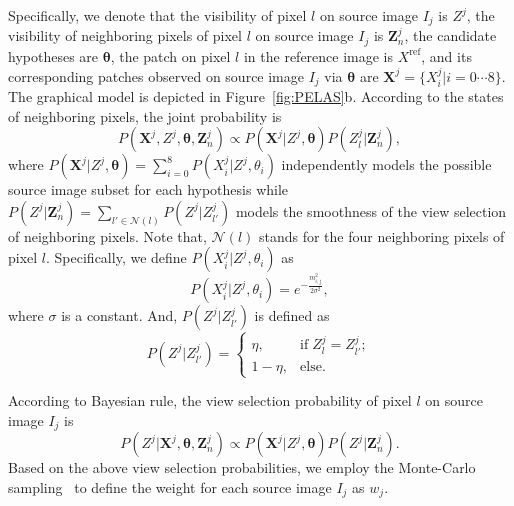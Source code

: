 \documentclass[letterpaper]{article} %
\begin{document}
Specifically, we denote that the visibility of pixel $l$ on source image $I_{j}$ is $Z^{j}$, the visibility of neighboring pixels of pixel $l$ on source image $I_{j}$ is $\boldsymbol{Z}_{n}^{j}$, the candidate hypotheses are $\boldsymbol{\theta}$, the patch on pixel $l$ in the reference image is $X^\text{ref}$, and its corresponding patches observed on source image $I_{j}$ via $\boldsymbol{\theta}$ are $\boldsymbol{X}^{j}=\{X_{i}^{j}|i=0\cdots8\}$. The graphical model is depicted in Figure~\ref{fig:PELAS}b. According to the states of neighboring pixels, %
the joint probability is 
\begin{equation}
P(\boldsymbol{X}^{j},Z^{j},\boldsymbol{\theta},\boldsymbol{Z}_{n}^{j}){\propto}P(\boldsymbol{X}^{j}|Z^{j},\boldsymbol{\theta})P(Z_{l}^{j}|\boldsymbol{Z}_{n}^{j}),
\end{equation}
where $P(\boldsymbol{X}^{j}|Z^{j},\boldsymbol{\theta})=\sum_{i=0}^{8}P(X_{i}^{j}|Z^{j},\theta_{i})$ independently models the possible source image subset for each hypothesis while $P(Z^{j}|\boldsymbol{Z}_{n}^{j})=\sum_{l'\in \mathcal{N}(l)} P(Z^{j}|Z_{l'}^{j})$ models the smoothness of the view selection of neighboring pixels. Note that, $\mathcal{N}(l)$ stands for the four neighboring pixels of pixel $l$. Specifically, we define $P(X_{i}^{j}|Z^{j},\theta_{i})$ as
\begin{equation}
P(X_{i}^{j}|Z^{j},\theta_{i})=e^{-\frac{m_{i,j}^2}{2\sigma^2}},
\end{equation}
where $\sigma$ is a constant. And, $P(Z^{j}|Z_{l'}^{j})$ is defined as
\begin{equation}
P(Z^{j}|Z_{l'}^{j})=\left\{ \begin{array}{ll}
\eta, & \textrm{if}\;Z_{l}^{j}=Z_{l'}^{j}; \\
1-\eta, & {\textrm{else.}}
\end{array} \right.
\end{equation}

According to Bayesian rule, the view selection probability of pixel $l$ on source image $I_{j}$ is 
\begin{equation}
P(Z^{j}|\boldsymbol{X}^{j},\boldsymbol{\theta},\boldsymbol{Z}_{n}^{j}){\propto}P(\boldsymbol{X}^{j}|Z^{j},\boldsymbol{\theta})P(Z^{j}|\boldsymbol{Z}_{n}^{j}).
\end{equation}
Based on the above view selection probabilities, we employ the Monte-Carlo sampling~\cite{Bishop2006PRML} to define the weight for each source image $I_{j}$ as $w_{j}$.
\end{document}
